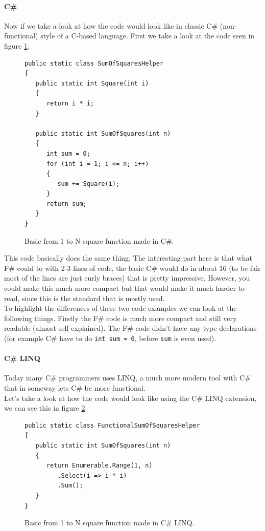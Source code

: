 \documentclass[12pt, a4paper]{article}
\newcommand{\code}[1]{{\small \texttt{#1}}}
\begin{document}
\newpage

\paragraph{C\#}
Now if we take a look at how the code would look like in classic C\# (non-functional) style of a C-based language. First we take a look at the code seen in figure \ref{fig:SquareFunctionCSharp}.

\begin{figure}[!h]
\begin{lstlisting}
public static class SumOfSquaresHelper
{
   public static int Square(int i)
   {
      return i * i;
   }

   public static int SumOfSquares(int n)
   {
      int sum = 0;
      for (int i = 1; i <= n; i++)
      {
         sum += Square(i);
      }
      return sum;
   }
}
\end{lstlisting}
\caption{Basic from 1 to N square function made in C\#.}
\label{fig:SquareFunctionCSharp}
\end{figure}

This code basically does the same thing. The interesting part here is that what F\# could to with 2-3 lines of code, the basic C\# would do in about 16 (to be fair most of the lines are just curly braces) that is pretty impressive. However, you could make this much more compact but that would make it much harder to read, since this is the standard that is mostly used.\\

To highlight the differences of these two code examples we can look at the following things. Firstly the F\# code is much more compact and still very readable (almost self explained). The F\# code didn't have any type declarations (for example C\# have to do \code{int sum = 0}, before \code{sum} is even used).
\newpage

\paragraph{C\# LINQ}
Today many C\# programmers uses LINQ, a much more modern tool with C\# that in someway lets C\# be more functional.\\

Let’s take a look at how the code would look like using the C\# LINQ extension, we can see this in figure \ref{fig:SquareFunctionCSharpLINQ}.

\begin{figure}[!h]
\begin{lstlisting}
public static class FunctionalSumOfSquaresHelper
{
   public static int SumOfSquares(int n)
   {
      return Enumerable.Range(1, n)
         .Select(i => i * i)
         .Sum();
   }
}
\end{lstlisting}
\caption{Basic from 1 to N square function made in C\# LINQ.}
\label{fig:SquareFunctionCSharpLINQ}
\end{figure}
\end{document}
